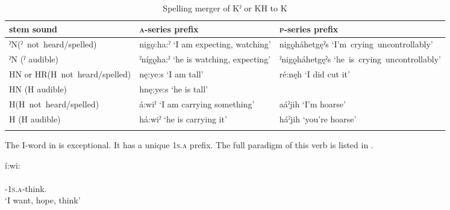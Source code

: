 \begin{table}
\caption{Spelling merger of Kˀ or KH to K}
\label{figtab:1:splmrgk}
{
\begin{tabularx}{\textwidth}{p{32mm}p{42mm}Q@{}}
\lsptoprule
stem sound & \textsc{a}-series prefix & \textsc{p}-series prefix\\
\midrule
ˀN\newline  \mbox{(ˀ not heard{\slash}spelled)} & nigǫ:ha:ˀ \newline ‘I am expecting, watching’ & nigǫ̱háhetgęˀs \newline \mbox{‘I’m crying uncontrollably’}\\
\tablevspace
{}ˀN (ˀ audible) & ˀnígǫ̱ha:ˀ \newline ‘he is watching, expecting’ & ˀnigǫ̱háhetgęˀs \newline \mbox{‘he is crying uncontrollably’}\\
\tablevspace
HN or HR\newline \mbox{(H not heard{\slash}spelled)} & n{ę}:ye:s \newline ‘I am tall’ & ré:nęh \newline ‘I did cut it’\\
HN (H audible) & hn{ę}:ye:s \newline ‘he is tall’ & \\
\tablevspace
H\newline  \mbox{(H not heard{\slash}spelled)} & á:wiˀ \newline ‘I am carrying something’ & aáˀjih \newline ‘I’m hoarse’\\
H (H audible) & há:wiˀ \newline ‘he is carrying it’ & háˀjih \newline ‘you’re hoarse’\\
\lspbottomrule
\end{tabularx}}
\end{table}

\largerpage[2]
The I-word in  is exceptional. It has a unique  \textsc{1s.a} prefix. The full paradigm of this verb is listed in .


\ea\label{ex:exceptionalfirstsoundex} í:wi: \\
\gll {} \\
{\prothetic}-\textsc{1s.a}-think.{\stative}\\
\glt ‘I want, hope, think’ 
\z


